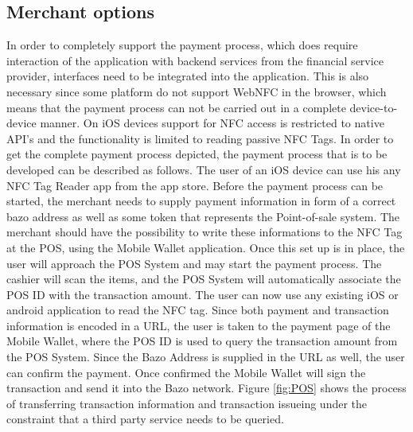 \subsection{Merchant options}\label{fig:tps}
In order to completely support the payment process, which does require interaction of the application with backend services from the financial service provider, interfaces need to be integrated into the application.
This is also necessary since some platform do not support WebNFC in the browser, which means that the payment process can not be carried out in a complete device-to-device manner. On iOS devices support for NFC access is restricted to native API's and the functionality is limited to reading passive NFC Tags.
In order to get the complete payment process depicted, the payment process that is to be developed can be described as follows. The user of an iOS device can use his any NFC Tag Reader app from the app store. Before the payment process can be started, the merchant needs to supply payment information in form of a correct bazo address as well as some token that represents the Point-of-sale system. The merchant should have the possibility to write these informations to the NFC Tag at the POS, using the Mobile Wallet application.
Once this set up is in place, the user will approach the POS System and may start the payment process. The cashier will scan the items, and the POS System will automatically associate the POS ID with the transaction amount. The user can now use any existing iOS or android application to read the NFC tag. Since both payment and transaction information is encoded in a URL, the user is taken to the payment page of the Mobile Wallet, where the POS ID is used to query the transaction amount from the POS System. Since the Bazo Address is supplied in the URL as well, the user can confirm the payment. Once confirmed the Mobile Wallet will sign the transaction and send it into the Bazo network. Figure
\ref{fig:POS} shows the process of transferring transaction information and transaction issueing under the constraint that a third party service needs to be queried.


